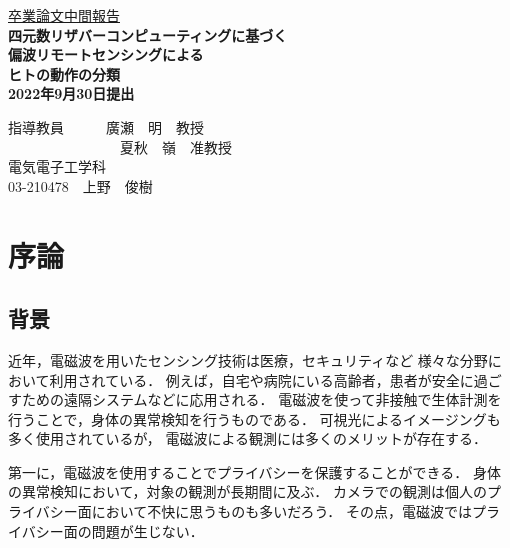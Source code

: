 \documentclass[uplatex,a4paper,10pt]{jsarticle}
\begin{document}
\begin{center}
\vspace*{3cm} \underline{\HUGE 卒業論文中間報告 }\\
\vspace{1cm}
\fontsize{24truept}{25truept}\selectfont
\bf{四元数リザバーコンピューティングに基づく\\ \vspace{5mm}
偏波リモートセンシングによる\\ \vspace{5mm}
ヒトの動作の分類\\}
\vspace{3cm}
\huge 2022年9月30日提出 \\
\vspace{3cm}
\end{center}
\begin{minipage}{0.4\hsize}
\hspace{1zw}
\end{minipage}
\begin{center}
\begin{minipage}{0.7\hsize}
{\huge 指導教員　　　廣瀬　明　教授\\　　　　　　　\ \ 夏秋　嶺　准教授}
\vspace{1cm}\\
\centering
{\huge 電気電子工学科\\}
{\huge 03-210478　上野　俊樹}
\end{minipage}
\end{center}


\newpage
\tableofcontents

\newpage 

\section{序論}
\subsection{背景}
近年，電磁波を用いたセンシング技術は医療，セキュリティなど
様々な分野において利用されている\cite{human_motion}．
例えば，自宅や病院にいる高齢者，患者が安全に過ごすための遠隔システムなどに応用される．
電磁波を使って非接触で生体計測を行うことで，身体の異常検知を行うものである．
可視光によるイメージングも多く使用されているが，
電磁波による観測には多くのメリットが存在する．

第一に，電磁波を使用することでプライバシーを保護することができる．
身体の異常検知において，対象の観測が長期間に及ぶ．
カメラでの観測は個人のプライバシー面において不快に思うものも多いだろう．
その点，電磁波ではプライバシー面の問題が生じない．
\end{document}
